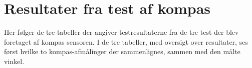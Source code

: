 \section{Resultater fra test af kompas}
Her følger de tre tabeller der angiver testresultaterne fra de tre test der blev foretaget af kompas sensoren.
I de tre tabeller, med oversigt over resultater, ses først hvilke to kompas-afmålinger der sammenlignes, sammen med den målte vinkel.



